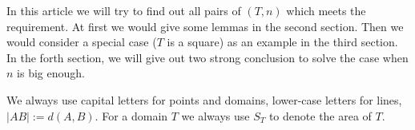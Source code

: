 In this article we will try to find out all pairs of $(T, n)$ which meets
the requirement. At first we would give some lemmas in the second
section. Then we would consider a special case ($T$ is a square)
as an example in the third section. In the forth section, we will
give out two strong conclusion to solve the case when $n$ is big enough.
		
We always use capital letters for points and domains, 
lower-case letters for lines, 
$|AB| := d(A, B)$. For a domain $T$ we always use $S_T$
to denote the area of $T$.